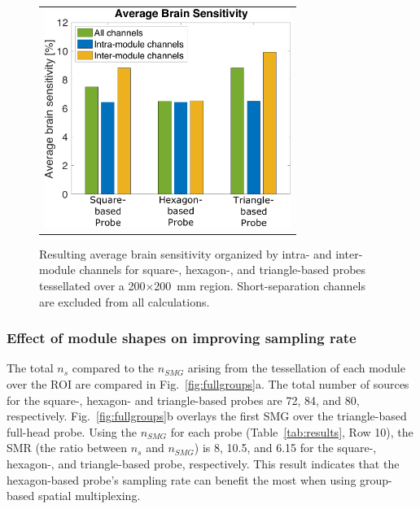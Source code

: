 \begin{figure}
    \begin{center}
    \begin{tabular}{c}
    \includegraphics[width=8cm]{fig/moca/Fig_6.pdf}
    \end{tabular}
    \end{center}
    \caption {Resulting average brain sensitivity organized by intra- and inter-module channels for square-, hexagon-, and triangle-based probes tessellated over a 200$\times$200~mm region. Short-separation channels are excluded from all calculations.} 
    \label{fig:fullbrainsensitivity}
\end{figure} 


\subsubsection{Effect of module shapes on improving sampling rate}
The total $n_s$ compared to the $n_{SMG}$ arising from the tessellation of each module over the ROI are compared in Fig.~\ref{fig:fullgroups}a. The total number of sources for the square-, hexagon- and triangle-based probes are 72, 84, and 80, respectively. Fig.~\ref{fig:fullgroups}b overlays the first SMG over the triangle-based full-head probe. Using the $n_{SMG}$ for each probe (Table~\ref{tab:results}, Row 10), the SMR (the ratio between $n_s$ and $n_{SMG}$) is 8, 10.5, and 6.15 for the square-, hexagon-, and triangle-based probe, respectively. This result indicates that the hexagon-based probe's sampling rate can benefit the most when using  group-based spatial multiplexing.


